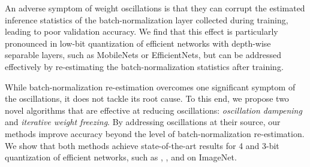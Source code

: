 An adverse symptom of weight oscillations is that they can corrupt the estimated inference statistics of the batch-normalization layer collected during training, leading to poor validation accuracy. We find that this effect is particularly pronounced in low-bit quantization of efficient networks with depth-wise separable layers, such as MobileNets or EfficientNets, but can be addressed effectively by re-estimating the batch-normalization statistics after training. %

While batch-normalization re-estimation overcomes one significant symptom of the oscillations, it does not tackle its root cause. To this end, we propose two novel algorithms that are effective at reducing oscillations: \textit{oscillation dampening} and  \textit{iterative weight freezing}. By addressing oscillations at their source, our methods improve accuracy beyond the level of batch-normalization re-estimation. We show that both methods achieve state-of-the-art results for 4 and 3-bit quantization of efficient networks, such as , , and  on ImageNet.

